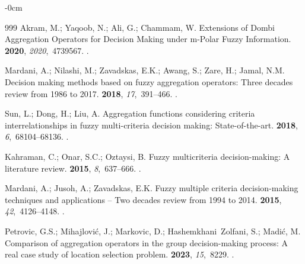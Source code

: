 \documentclass[mathematics,article,submit,moreauthors]{Definitions/mdpi}
\begin{document}
\begin{adjustwidth}{-\extralength}{0cm}
\begin{thebibliography}{999}
    Akram, M.; Yaqoob, N.; Ali, G.; Chammam, W.
    \newblock Extensions of Dombi Aggregation Operators for Decision Making under
    m-Polar Fuzzy Information.
     {\bf 2020}, {\em 2020},~4739567.
    .
    
    Mardani, A.; Nilashi, M.; Zavadskas, E.K.; Awang, S.; Zare, H.; Jamal, N.M.
    \newblock Decision making methods based on fuzzy aggregation operators: Three
    decades review from 1986 to 2017.
     {\bf 2018}, {\em 17},~391--466.
    .
    
    Sun, L.; Dong, H.; Liu, A.
    \newblock Aggregation functions considering criteria interrelationships in
    fuzzy multi-criteria decision making: State-of-the-art.
     {\bf 2018}, {\em 6},~68104--68136.
    .
    
    Kahraman, C.; Onar, S.C.; Oztaysi, B.
    \newblock Fuzzy multicriteria decision-making: A literature review.
    {\bf 2015}, {\em 8},~637--666.
    .
    
    Mardani, A.; Jusoh, A.; Zavadskas, E.K.
    \newblock Fuzzy multiple criteria decision-making techniques and applications
    -- Two decades review from 1994 to 2014.
     {\bf 2015}, {\em
        42},~4126--4148.
    .
    
    Petrovic, G.S.; Mihajlović, J.; Markovic, D.; Hashemkhani~Zolfani, S.; Madić,
    M.
    \newblock Comparison of aggregation operators in the group decision-making
    process: A real case study of location selection problem.
     {\bf 2023}, {\em 15},~8229.
    .


\end{thebibliography}
\end{adjustwidth}
\end{document}
